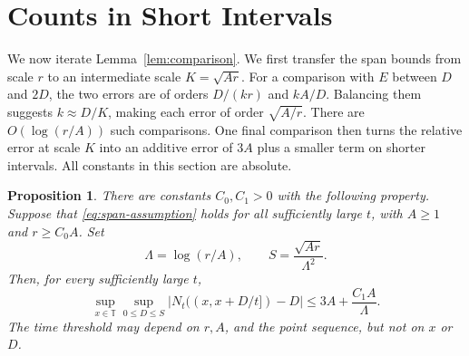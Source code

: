 \documentclass[11pt]{article}
\newtheorem{proposition}[theorem]{Proposition}
\theoremstyle{remark}
\numberwithin{equation}{section}
\newcommand{\T}{\mathbb{T}}
\begin{document}
\section{Counts in Short Intervals}
We now iterate Lemma~\ref{lem:comparison}. We first transfer the span bounds
from scale $r$ to an intermediate scale $K=\sqrt{Ar}$. For a comparison
with $E$ between $D$ and $2D$, the two errors are of orders $D/(kr)$ and
$kA/D$. Balancing them suggests $k\approx D/K$, making each error of order
$\sqrt{A/r}$. There are $O(\log(r/A))$ such comparisons. One final
comparison then turns the relative error at scale $K$ into an additive
error of $3A$ plus a smaller term on shorter intervals.
All constants in this section are absolute.
\begin{proposition}\label{prop:short}
There are constants $C_0,C_1>0$ with the following property. Suppose that
\eqref{eq:span-assumption} holds for all sufficiently large $t$, with
$A\geq1$ and $r\geq C_0A$. Set
\[
  \Lambda=\log(r/A),
  \qquad
  S=\frac{\sqrt{Ar}}{\Lambda^2}.
\]
Then, for every sufficiently large $t$,
\begin{equation}\label{eq:short-count}
  \sup_{x\in\T}\sup_{0\leq D\leq S}
  \left|N_t((x,x+D/t])-D\right|
  \leq3A+\frac{C_1A}{\Lambda}.
\end{equation}
The time threshold may depend on $r,A$, and the point sequence, but not
on $x$ or $D$.
\end{proposition}
\end{document}
